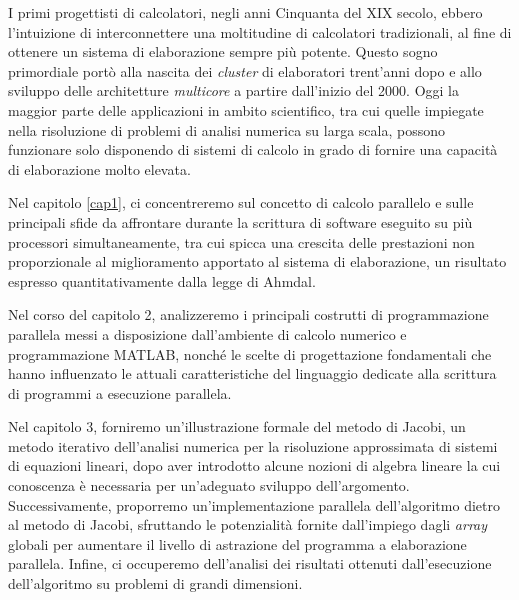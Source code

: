 I primi progettisti di calcolatori, negli anni Cinquanta del XIX secolo, ebbero l'intuizione di interconnettere
una moltitudine di calcolatori tradizionali, al fine di ottenere un sistema di elaborazione sempre più potente.\newline
Questo sogno primordiale port\`o alla nascita dei \textit{cluster} di elaboratori trent'anni dopo e allo sviluppo delle architetture
\textit{multicore} a partire dall'inizio del 2000.\newline
Oggi la maggior parte delle applicazioni in ambito scientifico, tra cui quelle impiegate nella risoluzione di problemi di analisi numerica
su larga scala, possono funzionare solo disponendo di sistemi di calcolo in grado di fornire una capacit\`a di elaborazione molto elevata.

Nel capitolo \ref{cap1}, ci concentreremo sul concetto di calcolo parallelo e sulle principali sfide da affrontare
durante la scrittura di software eseguito su pi\`u processori simultaneamente, tra cui spicca una crescita delle prestazioni non proporzionale
al miglioramento apportato al sistema di elaborazione, un risultato espresso quantitativamente dalla legge di Ahmdal.

Nel corso del capitolo 2, analizzeremo i principali costrutti di programmazione parallela messi a disposizione dall’ambiente di calcolo numerico
e programmazione MATLAB\textsuperscript{\textregistered}, nonch\'e le scelte di progettazione fondamentali che hanno influenzato
le attuali caratteristiche del linguaggio dedicate alla scrittura di programmi a esecuzione parallela.

Nel capitolo 3, forniremo un'illustrazione formale del metodo di Jacobi, un metodo iterativo dell’analisi numerica per la risoluzione
approssimata di sistemi di equazioni lineari, dopo aver introdotto alcune nozioni di algebra lineare la cui conoscenza \`e necessaria per un'adeguato
sviluppo dell'argomento.\newline
Successivamente, proporremo un’implementazione parallela dell'algoritmo dietro al metodo di Jacobi, sfruttando le potenzialità fornite
dall'impiego dagli \textit{array} globali per aumentare il livello di astrazione del programma a elaborazione parallela.\newline
Infine, ci occuperemo dell’analisi dei risultati ottenuti dall’esecuzione dell’algoritmo su problemi di grandi dimensioni.
